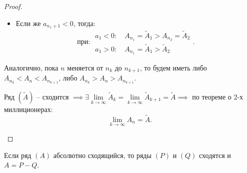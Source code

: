 \begin{proof}
\begin{enumerate}
\begin{itemize}
                  \item Если же $a_{n_1 + 1} < 0$, тогда:
                        \[
                            \text{при: }\begin{array}{l}
                                a_1 < 0: \quad A_{n_1} = \widetilde{A}_1 > A_{n_2} = \widetilde{A}_2 \\
                                a_1 > 0: \quad A_{n_1} = \widetilde{A}_1 > \widetilde{A}_2
                            \end{array}.
                        \]
              \end{itemize}

              Аналогично, пока $n$ меняется от $n_k$ до $n_{k+1}$, то будем иметь либо $A_{n_k} < A_n < A_{n_{k+1}}$, либо $A_{n_k} > A_n > A_{n_{k+1}}$.

              Ряд $(\widetilde{A})$ -- сходится $\implies \exists \underset{k\rightarrow\infty}{\lim}\widetilde{A}_k = \underset{k\rightarrow\infty}{\lim}\widetilde{A}_{k+1} = \widetilde{A} \implies$ по теореме о 2-х миллиционерах:
              \[
                  \underset{k\rightarrow\infty}{\lim}A_n = \widetilde{A}.
              \]
    \end{enumerate}
\end{proof}

\begin{lemma}
    Если ряд $(A)$ абсолютно сходящийся, то ряды $(P)$ и $(Q)$ сходятся и $A = P - Q$.
\end{lemma}

